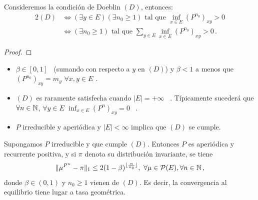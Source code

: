 \begin{property}
Consideremos la condición de Doeblin $(D)$, entonces:
\begin{alignat*}{2}
    (D) & \Longleftrightarrow (\exists y\in E)(\exists n_0 \geq 1) \mbox{ tal que }\displaystyle \inf_{x\in E}(P^{n_0})_{xy}>0 \\
     & \Longleftrightarrow (\exists n_0 \geq 1) \mbox{ tal que } \displaystyle \sum_{y\in E}\inf_{x\in E}(P^{n_0})_{xy}>0 \, .
\end{alignat*}
\end{property}
\begin{proof}
\ejercicio
\end{proof}
\begin{remark}
\beforeitemize
\begin{itemize}
    \item $\beta\in[0,1]$ \, (sumando con respecto a $y$ en $(D)$) y $\beta<1$ a menos que $(P^{n_0})_{xy}=m_y$ $\forall x,y\in E$ .
    \item $(D)$ es raramente satisfecha cuando $|E|=+\infty$ \, .
    Típicamente sucederá que $\forall n\in \mathbb{N}$, $\forall y\in E$ $\inf_{x\in E}(P^n)_{xy}=0$ \, .
    \item $P$ irreducible y aperiódica y $|E|<\infty$ implica que $(D)$ se cumple.
    \newline     \ejercicio
\end{itemize}
\end{remark}
\begin{theorem}
Supongamos $P$ irreducible y que cumple $(D)$. Entonces $P$ es aperiódica y recurrente positiva, y si $\pi$ denota su distribución invariante, se tiene
$$ \|\mu^{P^n}-\pi\|_1\leq 2(1-\beta)^{\lfloor\frac{n}{n_0}\rfloor}, \mbox{ } \forall \mu\in \mathcal{P}(E),\forall n\in\mathbb{N}\,,$$
donde $\beta\in(0,1)$ y $n_0\geq 1$ vienen de $(D)$. Es decir, la convergencia  al equilibrio tiene lugar a tasa geométrica.
\end{theorem}
